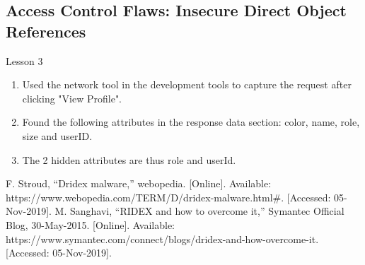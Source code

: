 \documentclass[conference]{IEEEtran}
\begin{document}
\subsection{Access Control Flaws: Insecure Direct Object References}
Lesson 3

\begin{enumerate}
\item Used the network tool in the development tools to capture the request after clicking "View Profile".
\item Found the following attributes in the response data section: color, name, role, size and userID.
\item The 2 hidden attributes are thus role and userId.
\end{enumerate}


\begin{thebibliography}{00}
 F. Stroud, “Dridex malware,” webopedia. [Online]. Available: https://www.webopedia.com/TERM/D/dridex-malware.html\#. [Accessed: 05-Nov-2019].
 M. Sanghavi, “RIDEX and how to overcome it,” Symantec Official Blog, 30-May-2015. [Online]. Available: https://www.symantec.com/connect/blogs/dridex-and-how-overcome-it. [Accessed: 05-Nov-2019].

\end{thebibliography}
\end{document}
